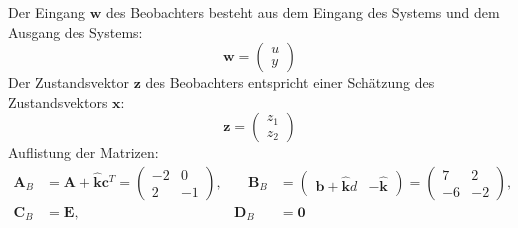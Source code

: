 \documentclass[crop=false]{standalone}
\begin{document}
\begin{task}
\begin{enumerate}[i]
\begin{solution}
Der Eingang $\mathbf{w}$ des Beobachters besteht aus dem Eingang des Systems und dem Ausgang des Systems:
\[\mathbf{w} = \begin{pmatrix}
u \\ y
\end{pmatrix}
\]
Der Zustandsvektor $\mathbf{z}$ des Beobachters entspricht einer Schätzung des Zustandsvektors $\mathbf{x}$:
\[\mathbf{z} = \begin{pmatrix}
z_1 \\ z_2
\end{pmatrix}
\]
Auflistung der Matrizen:
\[
\begin{aligned}
\mathbf{A}_B &= \mathbf{A}+\hat{\mathbf{k}} \mathbf{c}^{T} = \begin{pmatrix}
-2 & 0 \\
2 & -1
\end{pmatrix}, &\quad
\mathbf{B}_B &= 
\begin{pmatrix}
\mathbf{b}+\hat{\mathbf{k}} d &  - \hat{\mathbf{k}}
\end{pmatrix}
= \begin{pmatrix}
7 & 2 \\
-6 & -2
\end{pmatrix},\\
\mathbf{C}_B &= \mathbf{E},
&
\mathbf{D}_B &= \mathbf{0}
\end{aligned}
\]
\end{solution}

\end{enumerate}
\end{task}
\end{document}
